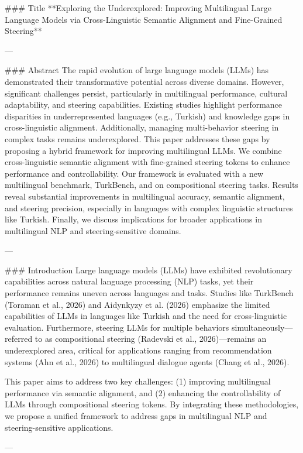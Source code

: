 ### Title  
**Exploring the Underexplored: Improving Multilingual Large Language Models via Cross-Linguistic Semantic Alignment and Fine-Grained Steering**

---

### Abstract  
The rapid evolution of large language models (LLMs) has demonstrated their transformative potential across diverse domains. However, significant challenges persist, particularly in multilingual performance, cultural adaptability, and steering capabilities. Existing studies highlight performance disparities in underrepresented languages (e.g., Turkish) and knowledge gaps in cross-linguistic alignment. Additionally, managing multi-behavior steering in complex tasks remains underexplored. This paper addresses these gaps by proposing a hybrid framework for improving multilingual LLMs. We combine cross-linguistic semantic alignment with fine-grained steering tokens to enhance performance and controllability. Our framework is evaluated with a new multilingual benchmark, TurkBench, and on compositional steering tasks. Results reveal substantial improvements in multilingual accuracy, semantic alignment, and steering precision, especially in languages with complex linguistic structures like Turkish. Finally, we discuss implications for broader applications in multilingual NLP and steering-sensitive domains.

---

### Introduction  
Large language models (LLMs) have exhibited revolutionary capabilities across natural language processing (NLP) tasks, yet their performance remains uneven across languages and tasks. Studies like TurkBench (Toraman et al., 2026) and Aidynkyzy et al. (2026) emphasize the limited capabilities of LLMs in languages like Turkish and the need for cross-linguistic evaluation. Furthermore, steering LLMs for multiple behaviors simultaneously—referred to as compositional steering (Radevski et al., 2026)—remains an underexplored area, critical for applications ranging from recommendation systems (Ahn et al., 2026) to multilingual dialogue agents (Chang et al., 2026). 

This paper aims to address two key challenges: (1) improving multilingual performance via semantic alignment, and (2) enhancing the controllability of LLMs through compositional steering tokens. By integrating these methodologies, we propose a unified framework to address gaps in multilingual NLP and steering-sensitive applications.

---

